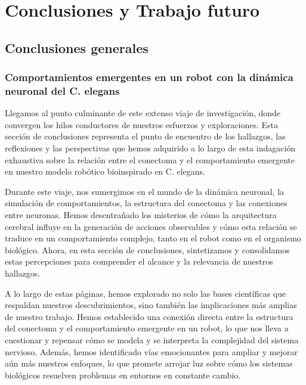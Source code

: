 \chapter{Conclusiones y Trabajo futuro}\label{cap:conclusuiones}
\graphicspath{{figs/capitulo_introduccion_robot/}}


\section{Conclusiones generales}

\subsection{Comportamientos emergentes en un robot con la dinámica neuronal del C.
	elegans}

Llegamos al punto culminante de este extenso viaje de investigación, donde convergen los hilos conductores de nuestros esfuerzos y exploraciones. Esta sección de conclusiones representa el punto de encuentro de los hallazgos, las reflexiones y las perspectivas que hemos adquirido a lo largo de esta indagación exhaustiva sobre la relación entre el conectoma y el comportamiento emergente en nuestro modelo robótico bioinspirado en C. elegans.

Durante este viaje, nos sumergimos en el mundo de la dinámica neuronal, la simulación de comportamientos, la estructura del conectoma y las conexiones entre neuronas. Hemos desentrañado los misterios de cómo la arquitectura cerebral influye en la generación de acciones observables y cómo esta relación se traduce en un comportamiento complejo, tanto en el robot como en el organismo biológico. Ahora, en esta sección de conclusiones, sintetizamos y consolidamos estas percepciones para comprender el alcance y la relevancia de nuestros hallazgos.

A lo largo de estas páginas, hemos explorado no solo las bases científicas que respaldan nuestros descubrimientos, sino también las implicaciones más amplias de nuestro trabajo. Hemos establecido una conexión directa entre la estructura del conectoma y el comportamiento emergente en un robot, lo que nos lleva a cuestionar y repensar cómo se modela y se interpreta la complejidad del sistema nervioso. Además, hemos identificado vías emocionantes para ampliar y mejorar aún más nuestros enfoques, lo que promete arrojar luz sobre cómo los sistemas biológicos resuelven problemas en entornos en constante cambio.



